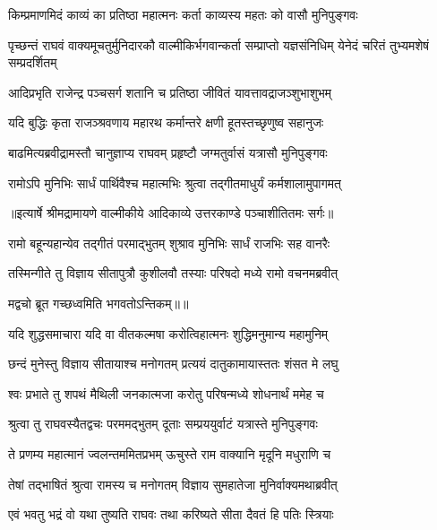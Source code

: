 \twolineshloka
{किम्प्रमाणमिदं काव्यं का प्रतिष्ठा महात्मनः}
{कर्ता काव्यस्य महतः को वासौ मुनिपुङ्गवः} %

\threelineshloka
{पृच्छन्तं राघवं वाक्यमूचतुर्मुनिदारकौ}
{वाल्मीकिर्भगवान्कर्ता सम्प्राप्तो यज्ञसंनिधिम्}
{येनेदं चरितं तुभ्यमशेषं सम्प्रदर्शितम्} %

\twolineshloka
{आदिप्रभृति राजेन्द्र पञ्चसर्ग शतानि च}
{प्रतिष्ठा जीवितं यावत्तावद्राजञ्शुभाशुभम्} %

\twolineshloka
{यदि बुद्धिः कृता राजञ्श्रवणाय महारथ}
{कर्मान्तरे क्षणी हूतस्तच्छृणुष्व सहानुजः} %

\twolineshloka
{बाढमित्यब्रवीद्रामस्तौ चानुज्ञाप्य राघवम्}
{प्रहृष्टौ जग्मतुर्वासं यत्रासौ मुनिपुङ्गवः} %

\twolineshloka
{रामोऽपि मुनिभिः सार्धं पार्थिवैश्च महात्मभिः}
{श्रुत्वा तद्गीतमाधुर्यं कर्मशालामुपागमत्} %


{॥इत्यार्षे श्रीमद्रामायणे वाल्मीकीये आदिकाव्ये उत्तरकाण्डे पञ्चाशीतितमः सर्गः॥}


\twolineshloka
{रामो बहून्यहान्येव तद्गीतं परमाद्भुतम्}
{शुश्राव मुनिभिः सार्धं राजभिः सह वानरैः} %

\twolineshloka
{तस्मिन्गीते तु विज्ञाय सीतापुत्रौ कुशीलवौ}
{तस्याः परिषदो मध्ये रामो वचनमब्रवीत्} %

{मद्वचो ब्रूत गच्छध्वमिति भगवतोऽन्तिकम्॥॥} %

\addtocounter{shlokacount}{1}

\twolineshloka
{यदि शुद्धसमाचारा यदि वा वीतकल्मषा}
{करोत्विहात्मनः शुद्धिमनुमान्य महामुनिम्} %

\twolineshloka
{छन्दं मुनेस्तु विज्ञाय सीतायाश्च मनोगतम्}
{प्रत्ययं दातुकामायास्ततः शंसत मे लघु} %

\twolineshloka
{श्वः प्रभाते तु शपथं मैथिली जनकात्मजा}
{करोतु परिषन्मध्ये शोधनार्थं ममेह च} %

\twolineshloka
{श्रुत्वा तु राघवस्यैतद्वचः परममद्भुतम्}
{दूताः सम्प्रययुर्वाटं यत्रास्ते मुनिपुङ्गवः} %

\twolineshloka
{ते प्रणम्य महात्मानं ज्वलन्तममितप्रभम्}
{ऊचुस्ते राम वाक्यानि मृदूनि मधुराणि च} %

\twolineshloka
{तेषां तद्भाषितं श्रुत्वा रामस्य च मनोगतम्}
{विज्ञाय सुमहातेजा मुनिर्वाक्यमथाब्रवीत्} %

\twolineshloka
{एवं भवतु भद्रं वो यथा तुष्यति राघवः}
{तथा करिष्यते सीता दैवतं हि पतिः स्त्रियाः} %

